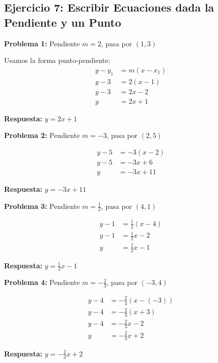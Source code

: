 \newpage

\subsection*{Ejercicio 7: Escribir Ecuaciones dada la Pendiente y un Punto}

\textbf{Problema 1:} Pendiente $m = 2$, pasa por $(1, 3)$

Usamos la forma punto-pendiente:
\begin{align*}
y - y_1 &= m(x - x_1) \\
y - 3 &= 2(x - 1) \\
y - 3 &= 2x - 2 \\
y &= 2x + 1
\end{align*}

\textbf{Respuesta:} $y = 2x + 1$

\medskip

\textbf{Problema 2:} Pendiente $m = -3$, pasa por $(2, 5)$

\begin{align*}
y - 5 &= -3(x - 2) \\
y - 5 &= -3x + 6 \\
y &= -3x + 11
\end{align*}

\textbf{Respuesta:} $y = -3x + 11$

\medskip

\textbf{Problema 3:} Pendiente $m = \frac{1}{2}$, pasa por $(4, 1)$

\begin{align*}
y - 1 &= \frac{1}{2}(x - 4) \\
y - 1 &= \frac{1}{2}x - 2 \\
y &= \frac{1}{2}x - 1
\end{align*}

\textbf{Respuesta:} $y = \frac{1}{2}x - 1$

\medskip

\textbf{Problema 4:} Pendiente $m = -\frac{2}{3}$, pasa por $(-3, 4)$

\begin{align*}
y - 4 &= -\frac{2}{3}(x - (-3)) \\
y - 4 &= -\frac{2}{3}(x + 3) \\
y - 4 &= -\frac{2}{3}x - 2 \\
y &= -\frac{2}{3}x + 2
\end{align*}

\textbf{Respuesta:} $y = -\frac{2}{3}x + 2$

\medskip


